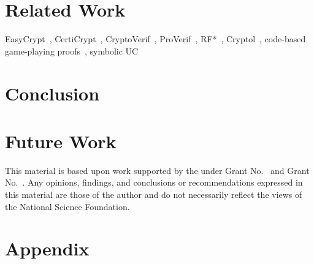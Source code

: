 \documentclass[acmsmall,review,anonymous]{acmart}\settopmatter{printfolios=true,printccs=false,printacmref=false}
\begin{document}


\section{Related Work}
EasyCrypt~\cite{barthe2011computer}, CertiCrypt~\cite{barthe2009formal},
CryptoVerif~\cite{blanchet2007cryptoverif},
ProVerif~\cite{blanchet2005proverif}, RF*~\cite{barthe2014probabilistic},
Cryptol~\cite{lewis2003cryptol}, code-based game-playing
proofs~\cite{bellare2006security}, symbolic UC~\cite{bohl2016symbolic}
\section{Conclusion}

\section{Future Work}

\begin{acks}                            %
  This material is based upon work supported by the
   under Grant
  No.~ and Grant
  No.~.  Any opinions, findings, and
  conclusions or recommendations expressed in this material are those
  of the author and do not necessarily reflect the views of the
  National Science Foundation.
\end{acks}





\appendix
\section{Appendix}
\end{document}
